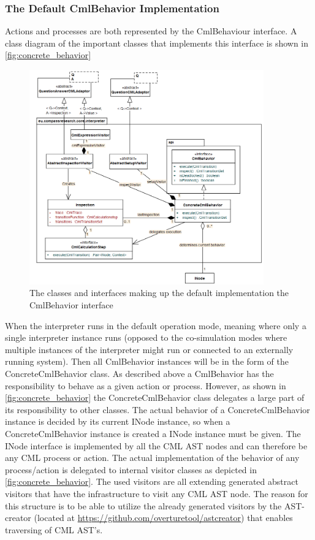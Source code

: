\documentclass[a4paper, 10pt]{include/compassreport}   %
\begin{document}
\subsubsection*{The Default CmlBehavior Implementation}
\label{sec:action_process_structure}
Actions and processes are both represented by the CmlBehaviour
interface. A class diagram of the important classes that implements
this interface is shown in \autoref{fig:concrete_behavior}
\begin{figure}[ht!]
  \begin{center}
    \includegraphics[width=0.9\textwidth]{figures/defaultCmlBehaviorImpl}
    \caption{The classes and interfaces making up the default implementation the CmlBehavior interface}
    \label{fig:concrete_behavior}
  \end{center}
\end{figure}
When the interpreter runs in the default operation mode, meaning where
only a single interpreter instance runs (opposed to the co-simulation
modes where multiple instances of the interpreter might run or
connected to an externally running system). Then all CmlBehavior
instances will be in the form of the ConcreteCmlBehavior class. As
described above a CmlBehavior has the responsibility to behave as a
given action or process. However, as shown in
\autoref{fig:concrete_behavior} the ConcreteCmlBehavior class
delegates a large part of its responsibility to other classes. The
actual behavior of a ConcreteCmlBehavior instance is decided by its
current INode instance, so when a ConcreteCmlBehavior instance is
created a INode instance must be given. The INode interface is
implemented by all the CML AST nodes and can therefore be any CML
process or action.  The actual implementation of the behavior of any
process/action is delegated to internal visitor classes as depicted in
\autoref{fig:concrete_behavior}. The used visitors are all extending
generated abstract visitors that have the infrastructure to visit any
CML AST node. The reason for this structure is to be able to utilize
the already generated visitors by the AST-creator (located at
\url{https://github.com/overturetool/astcreator}) that enables
traversing of CML AST's.
\end{document}
